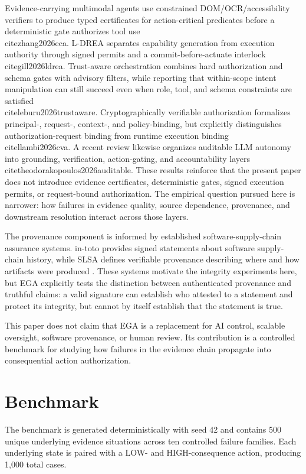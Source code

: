 \documentclass[11pt]{article}
\begin{document}
Evidence-carrying multimodal agents use constrained DOM/OCR/accessibility verifiers to produce typed certificates for action-critical predicates before a deterministic gate authorizes tool use \\cite{zhang2026eca}. L-DREA separates capability generation from execution authority through signed permits and a commit-before-actuate interlock \\cite{gill2026ldrea}. Trust-aware orchestration combines hard authorization and schema gates with advisory filters, while reporting that within-scope intent manipulation can still succeed even when role, tool, and schema constraints are satisfied \\cite{leburu2026trustaware}. Cryptographically verifiable authorization formalizes principal-, request-, context-, and policy-binding, but explicitly distinguishes authorization-request binding from runtime execution binding \\cite{llambi2026cva}. A recent review likewise organizes auditable LLM autonomy into grounding, verification, action-gating, and accountability layers \\cite{theodorakopoulos2026auditable}. These results reinforce that the present paper does not introduce evidence certificates, deterministic gates, signed execution permits, or request-bound authorization. The empirical question pursued here is narrower: how failures in evidence quality, source dependence, provenance, and downstream resolution interact across those layers.

The provenance component is informed by established software-supply-chain assurance systems. in-toto provides signed statements about software supply-chain history, while SLSA defines verifiable provenance describing where and how artifacts were produced \cite{torresarias2019intoto,slsa2026}. These systems motivate the integrity experiments here, but EGA explicitly tests the distinction between authenticated provenance and truthful claims: a valid signature can establish who attested to a statement and protect its integrity, but cannot by itself establish that the statement is true.

This paper does not claim that EGA is a replacement for AI control, scalable oversight, software provenance, or human review. Its contribution is a controlled benchmark for studying how failures in the evidence chain propagate into consequential action authorization.

\section{Benchmark}
The benchmark is generated deterministically with seed 42 and contains 500 unique underlying evidence situations across ten controlled failure families. Each underlying state is paired with a LOW- and HIGH-consequence action, producing 1,000 total cases.
\end{document}
